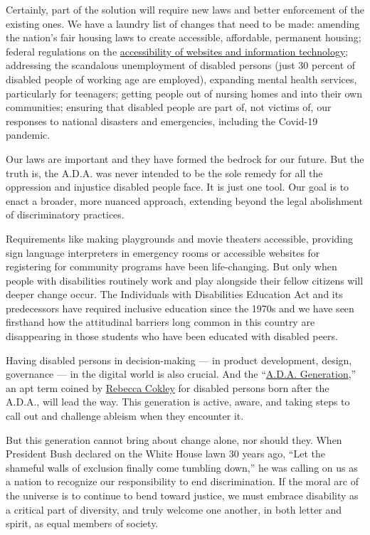 Certainly, part of the solution will require new laws and better
enforcement of the existing ones. We have a laundry list of changes that
need to be made: amending the nation's fair housing laws to create
accessible, affordable, permanent housing; federal regulations on the
\href{https://www.nytimes.com/2020/07/14/style/assistive-technology.html}{accessibility
of websites and information technology}; addressing the scandalous
unemployment of disabled persons (just 30 percent of disabled people of
working age are employed), expanding mental health services,
particularly for teenagers; getting people out of nursing homes and into
their own communities; ensuring that disabled people are part of, not
victims of, our responses to national disasters and emergencies,
including the Covid-19 pandemic.

Our laws are important and they have formed the bedrock for our future.
But the truth is, the A.D.A. was never intended to be the sole remedy
for all the oppression and injustice disabled people face. It is just
one tool. Our goal is to enact a broader, more nuanced approach,
extending beyond the legal abolishment of discriminatory practices.

Requirements like making playgrounds and movie theaters accessible,
providing sign language interpreters in emergency rooms or accessible
websites for registering for community programs have been life-changing.
But only when people with disabilities routinely work and play alongside
their fellow citizens will deeper change occur. The Individuals with
Disabilities Education Act and its predecessors have required inclusive
education since the 1970s and we have seen firsthand how the attitudinal
barriers long common in this country are disappearing in those students
who have been educated with disabled peers.

Having disabled persons in decision-making --- in product development,
design, governance --- in the digital world is also crucial. And the
``\href{https://www.nytimes.com/2020/07/17/style/americans-with-disabilities-act.html}{A.D.A.
Generation},'' an apt term coined by
\href{https://www.refinery29.com/en-us/2020/07/9923121/ada-american-disabilities-act-money-coronavirus}{Rebecca
Cokley} for disabled persons born after the A.D.A., will lead the way.
This generation is active, aware, and taking steps to call out and
challenge ableism when they encounter it.

But this generation cannot bring about change alone, nor should they.
When President Bush declared on the White House lawn 30 years ago, ``Let
the shameful walls of exclusion finally come tumbling down,'' he was
calling on us as a nation to recognize our responsibility to end
discrimination. If the moral arc of the universe is to continue to bend
toward justice, we must embrace disability as a critical part of
diversity, and truly welcome one another, in both letter and spirit, as
equal members of society.

